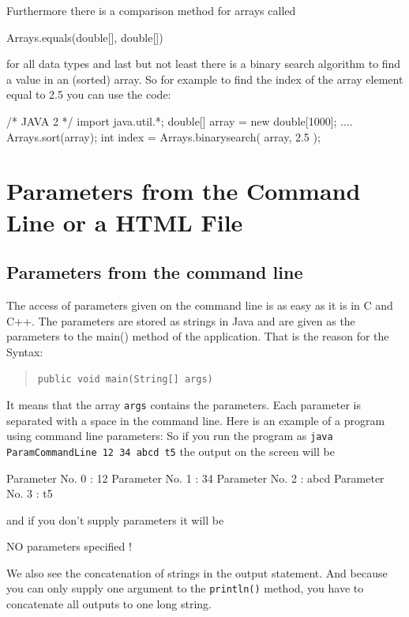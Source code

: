 Furthermore there is a comparison method for arrays called
\begin{sverbatim}
Arrays.equals(double[], double[])
\end{sverbatim}
for all data types and
last but not least there is a binary search algorithm to
find a value in an (sorted) array. So for example to find the index of the
array element equal to 2.5 you can use the code:
\begin{sverbatim}
  /* JAVA 2 */
  import java.util.*;
  double[] array = new double[1000];
  ....
  Arrays.sort(array);
  int index = Arrays.binarysearch( array, 2.5 );
\end{sverbatim}

\section{Parameters from the Command Line or a HTML File}
\label{sec:Parameter}


\subsection{Parameters from the command line}
The access of parameters given on the command line is as easy as it
is in C and C++. The parameters are stored as strings in Java and
are given as the parameters to the main() method of the application.
That is the reason for the Syntax:
\begin{quotation}
  \verb|public void main(String[] args) |
\end{quotation}
It means that the array \verb|args| contains the parameters. Each parameter
is separated with a space in the command line. Here is an example of a 
program using command line parameters:
So if you run the program as \verb|java ParamCommandLine 12 34 abcd t5|
the output on the screen will be
\begin{sverbatim}
 Parameter No. 0 : 12
 Parameter No. 1 : 34
 Parameter No. 2 : abcd
 Parameter No. 3 : t5
\end{sverbatim}
and if you don't supply parameters it will be
\begin{sverbatim}
 NO parameters specified !
\end{sverbatim}
We also see the concatenation of strings in the output statement.
And because you can only supply one argument to the  \verb|println()|
method, you have to concatenate all outputs to one long string.

